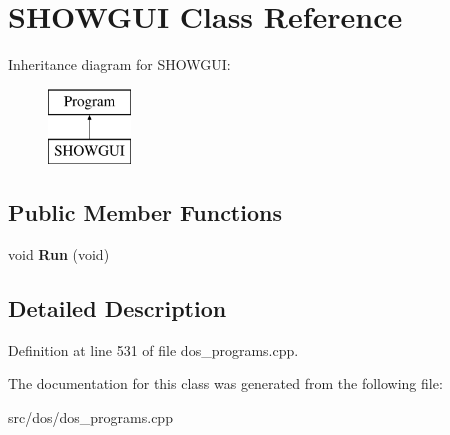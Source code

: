 \hypertarget{classSHOWGUI}{\section{S\-H\-O\-W\-G\-U\-I Class Reference}
\label{classSHOWGUI}
}
Inheritance diagram for S\-H\-O\-W\-G\-U\-I\-:\begin{figure}[H]
\begin{center}
\leavevmode
\includegraphics[height=2.000000cm]{classSHOWGUI}
\end{center}
\end{figure}
\subsection*{Public Member Functions}
\begin{DoxyCompactItemize}
\item 
\hypertarget{classSHOWGUI_a6aa41914fca5264f9c63856c9578dd29}{void {\bfseries Run} (void)}\label{classSHOWGUI_a6aa41914fca5264f9c63856c9578dd29}

\end{DoxyCompactItemize}


\subsection{Detailed Description}


Definition at line 531 of file dos\-\_\-programs.\-cpp.



The documentation for this class was generated from the following file\-:\begin{DoxyCompactItemize}
\item 
src/dos/dos\-\_\-programs.\-cpp\end{DoxyCompactItemize}
